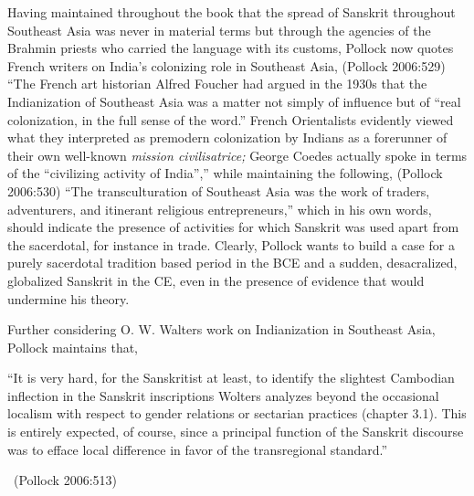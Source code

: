 Having maintained throughout the book that the spread of Sanskrit throughout Southeast Asia was never in material terms but through the agencies of the Brahmin priests who carried the language with its customs, Pollock now quotes French writers on India’s colonizing role in Southeast Asia, (Pollock 2006:529) “The French art historian Alfred Foucher had argued in the 1930s that the Indianization of Southeast Asia was a matter not simply of influence but of “real colonization, in the full sense of the word.” French Orientalists evidently viewed what they interpreted as premodern colonization by Indians as a forerunner of their own well-known \textit{mission civilisatrice;} George Coedes actually spoke in terms of the “civilizing activity of India”,” while maintaining the following, (Pollock 2006:530) “The transculturation of Southeast Asia was the work of traders, adventurers, and itinerant religious entrepreneurs,” which in his own words, should indicate the presence of activities for which Sanskrit was used apart from the sacerdotal, for instance in trade. Clearly, Pollock wants to build a case for a purely sacerdotal tradition based period in the BCE and a sudden, desacralized, globalized Sanskrit in the CE, even in the presence of evidence that would undermine his theory.

Further considering O. W. Walters work on Indianization in Southeast Asia, Pollock maintains that,

\begin{myquote}
“It is very hard, for the Sanskritist at least, to identify the slightest Cambodian inflection in the Sanskrit inscriptions Wolters analyzes beyond the occasional localism with respect to gender relations or sectarian practices (chapter 3.1). This is entirely expected, of course, since a principal function of the Sanskrit discourse was to efface local difference in favor of the transregional standard.” 

\vskip -5pt

~\hfill (Pollock 2006:513)
\end{myquote}

